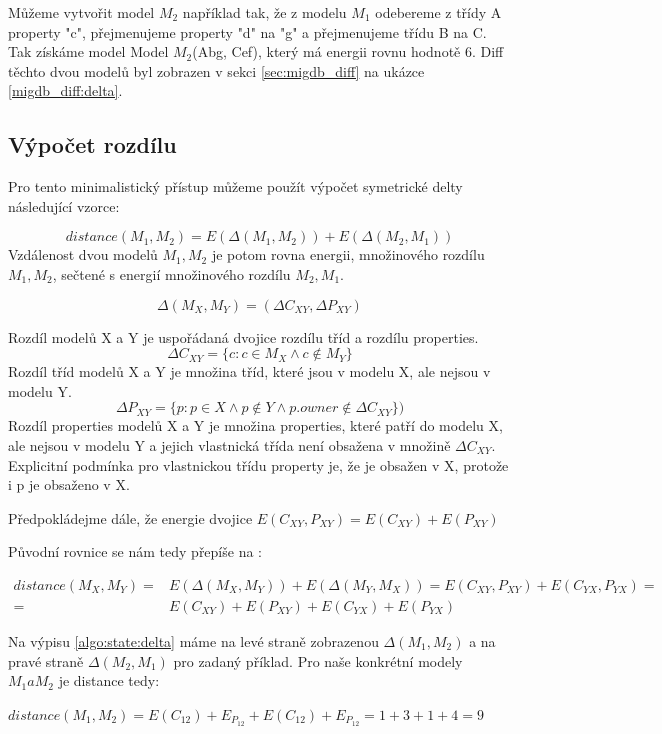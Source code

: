 \documentclass[11pt,twoside,a4paper]{book}
\begin{document}
Můžeme vytvořit model $M_2$ například tak, že z modelu $M_1$ odebereme z třídy A
property "c", přejmenujeme property "d" na "g" a přejmenujeme třídu B na C. Tak
získáme model Model $M_2$(Abg, Cef), který má energii rovnu hodnotě 6. Diff
těchto dvou modelů byl zobrazen v sekci \ref{sec:migdb_diff} na ukázce
\ref{migdb_diff:delta}.


\subsection{Výpočet rozdílu}
Pro tento minimalistický přístup můžeme použít výpočet symetrické delty
následující vzorce:

$$distance(M_1,M_2) = E(\Delta(M_1,M_2)) + E(\Delta(M_2, M_1))$$
Vzdálenost dvou modelů $M_1, M_2$ je potom rovna energii, množinového rozdílu
$M_1,M_2$, sečtené s energií množinového rozdílu $M_2, M_1$.

$$\Delta(M_X,M_Y) = (\Delta {C_{XY}}, \Delta{P_{XY}}) $$

Rozdíl modelů X a Y je uspořádaná dvojice rozdílu tříd a rozdílu properties.
$$\Delta {C_{XY}} = \{c: c \in M_X \wedge c \notin M_Y\}$$
Rozdíl tříd modelů X a Y je množina tříd, které jsou v modelu X, ale nejsou v
modelu Y.
 $$\Delta{P_{XY}} = \{p: p \in X \wedge p \notin Y \wedge p.owner
\notin \Delta {C_{XY}}\})$$
Rozdíl properties modelů X a Y je množina properties, které patří do modelu X,
ale nejsou v modelu Y a jejich vlastnická třída není obsažena v množině  $\Delta
{C_{XY}}$. Explicitní podmínka pro vlastnickou třídu property je, že je obsažen
v X, protože i p je obsaženo v X.


Předpokládejme dále, že energie dvojice $E(C_{XY}, P_{XY}) = E(C_{XY}) +
E(P_{XY})$ 

Původní rovnice se nám tedy přepíše na :

\begin{align} distance(M_X,M_Y) = & E(\Delta(M_X,M_Y)) + E(\Delta(M_Y, M_X)) =
E(C_{XY}, P_{XY}) + E(C_{YX}, P_{YX}) = \nonumber \\ = & E(C_{XY}) + E(P_{XY}) +
E(C_{YX}) + E(P_{YX}) \nonumber
\end{align}



Na výpisu \ref{algo:state:delta} máme na levé straně zobrazenou
$\Delta(M_1,M_2)$ a na pravé straně $\Delta(M_2,M_1)$ pro zadaný příklad. Pro
naše konkrétní modely $M_1 a M_2$ je distance tedy:

$distance(M_1,M_2) = E(C_{12}) + E_{P_{12}} + E(C_{12}) + E_{P_{12}} = 1 + 3 +
1 + 4 = 9$
\end{document}
